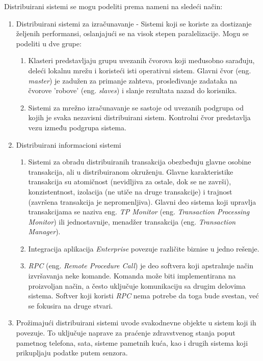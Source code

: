\documentclass[12pt,oneside]{memoir}
\begin{document}
Distribuirani sistemi se mogu podeliti prema nameni na sledeći način:
\begin{enumerate}
\item Distribuirani sistemi za izračunavanje - Sistemi koji se koriste za dostizanje željenih performansi, oslanjajući se na visok stepen paralelizacije. Mogu se podeliti u dve grupe:
	\begin{enumerate}
	\item Klasteri predstavljaju grupu uvezanih čvorova koji međusobno sarađuju, deleći lokalnu mrežu i koristeći isti operativni sistem. Glavni čvor (eng. \emph{master}) je zadužen za primanje zahteva, prosleđivanje zadataka na čvorove 'robove' (eng. \emph{slaves}) i slanje rezultata nazad do korisnika.
	\item Sistemi za mrežno izračunavanje se sastoje od uvezanih podgrupa od kojih je svaka nezavisni distribuirani sistem. Kontrolni čvor predstavlja vezu između podgrupa sistema.
	\end{enumerate}
\item Distribuirani informacioni sistemi
	\begin{enumerate}
	\item Sistemi za obradu distribuiranih transakcija obezbeđuju glavne osobine transakcija, ali u distribuiranom okruženju. Glavne karakteristike transakcija su atomičnost (nevidljiva za ostale, dok se ne završi), konzistentnost, izolacija (ne utiče na druge transakcije) i trajnost (završena transakcija je nepromenljiva). Glavni deo sistema koji upravlja transakcijama se naziva eng. \emph{TP Monitor} (eng. \emph{Transaction Processing Monitor}) ili jednostavnije, menadžer transakcija (eng. \emph{Transaction Manager}).
	\item Integracija aplikacija \emph{Enterprise} povezuje različite biznise u jedno rešenje.
	\item \emph{RPC} (eng. \emph{Remote Procedure Call}) je deo softvera koji apstrahuje način izvršavanja neke komande. Komanda može biti implementirana na proizvoljan način, a često uključuje komunikaciju sa drugim delovima sistema. Softver koji koristi \emph{RPC} nema potrebe da toga bude svestan, već se fokusira na druge stvari. 
	\end{enumerate}
\item Prožimajući distribuirani sistemi uvode svakodnevne objekte u sistem koji ih povezuje. To uključuje naprave za praćenje zdravstvenog stanja poput pametnog telefona, sata, sisteme pametnih kuća, kao i drugih sistema koji prikupljaju podatke putem senzora.
\end{enumerate}
\end{document}
